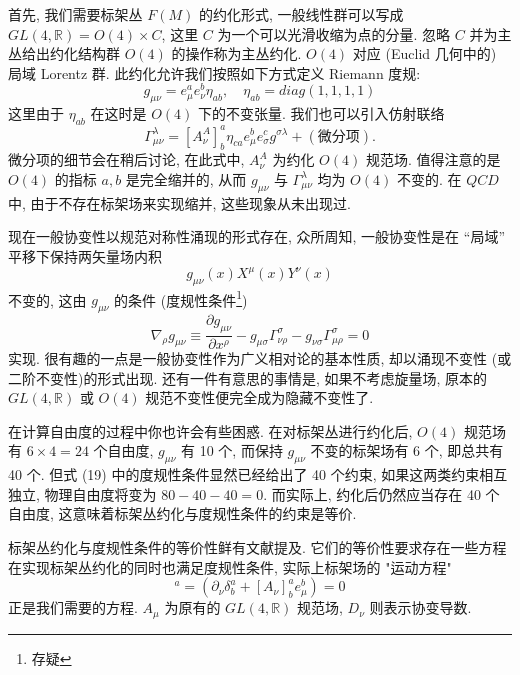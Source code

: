 \documentclass{article}
\begin{document}
首先, 我们需要标架丛 $F(M)$ 的约化形式, 一般线性群可以写成  $GL(4,\mathbb{R})=O(4)\times C$, 这里 $C$ 为一个可以光滑收缩为点的分量. 忽略 $C$ 并为主丛给出约化结构群 $O(4)$ 的操作称为主丛约化. $O(4)$ 对应 (Euclid 几何中的) 局域 Lorentz 群. 此约化允许我们按照如下方式定义 Riemann 度规:
\begin{equation}
g_{\mu\nu}=e_{\mu}^{a}e^{b}_{\nu}\eta_{ab}, \quad\eta_{ab}=diag(1,1,1,1)
\end{equation}
这里由于 $\eta_{ab}$ 在这时是 $O(4)$ 下的不变张量. 我们也可以引入仿射联络
\begin{equation}
\Gamma_{\mu\nu}^{\lambda}=[A_{\nu}^{A}]_{b}^{a}\eta_{ca}e_{\mu}^{b}e_{\sigma}^{c}g^{\sigma\lambda}+(\text{微分项}).
\end{equation}
微分项的细节会在稍后讨论, 在此式中, $A_{\nu}^{A}$ 为约化 $O(4)$ 规范场. 值得注意的是 $O(4)$ 的指标 $a,b$ 是完全缩并的, 从而 $g_{\mu\nu}$ 与 $\Gamma_{\mu\nu}^{\lambda}$ 均为 $O(4)$ 不变的. 在 $QCD$ 中, 由于不存在标架场来实现缩并, 这些现象从未出现过.

 现在一般协变性以规范对称性涌现的形式存在, 众所周知, 一般协变性是在 “局域” 平移下保持两矢量场内积
 \begin{equation}
 g_{\mu\nu}(x)X^{\mu}(x)Y^{\nu}(x)
 \end{equation}不变的, 这由 $g_{\mu\nu}$ 的条件 (度规性条件\footnote{存疑})
\begin{equation}
\nabla_{\rho}g_{\mu\nu}\equiv \frac{\partial g_{\mu\nu}}{\partial x^{\rho}}-g_{\mu\sigma}\Gamma_{\nu\rho}^{\sigma}-g_{\nu\sigma}\Gamma_{\mu\rho}^{\sigma}=0
\end{equation}
实现. 很有趣的一点是一般协变性作为广义相对论的基本性质, 却以涌现不变性 (或二阶不变性)的形式出现. 还有一件有意思的事情是, 如果不考虑旋量场, 原本的 $GL(4,\mathbb{R})$ 或 $O(4)$ 规范不变性便完全成为隐藏不变性了.

在计算自由度的过程中你也许会有些困惑. 在对标架丛进行约化后, $O(4)$ 规范场有 $6\times4=24$ 个自由度, $g_{\mu\nu}$ 有 10 个, 而保持 $g_{\mu\nu}$ 不变的标架场有 6 个, 即总共有 40 个. 但式 (19) 中的度规性条件显然已经给出了 40 个约束, 如果这两类约束相互独立, 物理自由度将变为 $80-40-40=0$. 而实际上, 约化后仍然应当存在 40 个自由度, 这意味着标架丛约化与度规性条件的约束是等价.

标架丛约化与度规性条件的等价性鲜有文献提及. 它们的等价性要求存在一些方程在实现标架丛约化的同时也满足度规性条件, 实际上标架场的 "运动方程"
\begin{equation}
[D_{\nu}e_{\mu}]^{a}=(\partial_{\nu}\delta_{b}^{a}+[A_{\nu}]^{a}_{b}e_{\mu}^{b})=0
\end{equation}
正是我们需要的方程. $A_{\mu}$ 为原有的 $GL(4,\mathbb{R})$ 规范场, $D_{\nu}$ 则表示协变导数.
\end{document}

